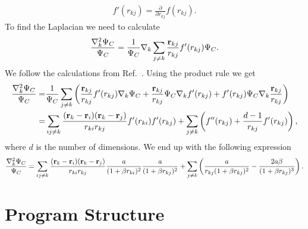 \documentclass[../main.tex]{subfiles}
\begin{document}
\begin{appendices}
\begin{align}
    f'(r_{kj}) = \frac{\partial}{\partial r_{kj}} f(r_{kj}).
\end{align}
To find the Laplacian we need to calculate
\begin{align}
    \frac{\nabla^2_k \Psi_C}{\Psi_C } = \frac{1}{ \Psi_C }\nabla_k\sum_{j\ne k}\frac{{\bf r}_{kj}}{r_{kj}} f'(r_{kj}) \Psi_C.
\end{align}
We follow the calculations from Ref.~\cite{FYS4411-LectureNotes}. Using the product rule we get
\begin{align}
    \frac{\nabla^2_k \Psi_C}{\Psi_C } = &\frac{1}{ \Psi_C }\sum_{j\ne k}\left(\frac{{\bf r}_{kj}}{r_{kj}} f'(r_{kj}) \nabla_k\Psi_C + \frac{{\bf r}_{kj}}{r_{kj}} \Psi_C \nabla_k f'(r_{kj}) + f'(r_{kj}) \Psi_C \nabla_k\frac{{\bf r}_{kj}}{r_{kj}}\right)\\
    = &\sum_{ij\ne k}\frac{({\bf r}_k-{\bf r}_i)({\bf r}_k-{\bf r}_j)}{r_{ki}r_{kj}}f'(r_{ki})f'(r_{kj})+
    \sum_{j\ne k}\left( f''(r_{kj})+\frac{d-1}{r_{kj}}f'(r_{kj})\right),
\end{align}
where $d$ is the number of dimensions. We end up with the following expression 
\begin{align}
    \frac{\nabla^2_k \Psi_C}{\Psi_C }=
    \sum_{ij\ne k}\frac{({\bf r}_k-{\bf r}_i)({\bf r}_k-{\bf r}_j)}{r_{ki}r_{kj}}\frac{a}{(1+\beta r_{ki})^2}
    \frac{a}{(1+\beta r_{kj})^2}+
    \sum_{j\ne k}\left(\frac{a}{r_{kj}(1+\beta r_{kj})^2}-\frac{2a\beta}{(1+\beta r_{kj})^3}\right).
\end{align}


\chapter{Program Structure}\label{sec: Program Structure Appendix}


\end{appendices}
\end{document}
